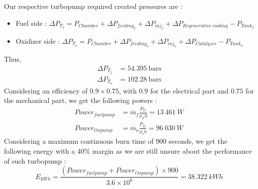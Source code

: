Our respective turbopump required created pressures are : 
\begin{itemize}
	\item Fuel side : $\Delta P_{T_f} = P_{Chamber} + \Delta P_{feeding_f} + \Delta P_{inj_f} + \Delta P_{Regenerative\ cooling} - P_{Tank_f}$
	\item Oxidizer side : 	$\Delta P_{T_o} = P_{Chamber} + \Delta P_{feeding_o} + \Delta P_{inj_o} + \Delta P_{Catalyzer} - P_{Tank_o}$
\end{itemize}
Thus,
\begin{align}
\Delta P_{T_f} &= 54.395\ \text{bars}\\
\Delta P_{T_o} &= 102.28\ \text{bars}
\end{align}
Considering an efficiency of $0.9\times 0.75$, with $0.9$ for the electrical part and $0.75$ for the mechanical part, we get the following powers :
\begin{align}
	Power_{fuelpump} &=\dot{m_f}\frac{P_{T_f}}{\rho_F \eta} = 13\ 461\ W\\
	Power_{Oxpump} &= \dot{m_o}\frac{P_{T_o}}{\rho_o \eta} = 96\ 030\ W
\end{align}
Considering a maximum continuous burn time of $900$ seconds, we get the following energy with a 40\% margin as we are still unsure about the performance of such turbopump :\\
\begin{equation}
	E_{kWh} = \frac{(Power_{fuelpump} + Power_{Oxpump})\times 900}{3.6\times 10^6} = 38.322\ kWh
\end{equation}

